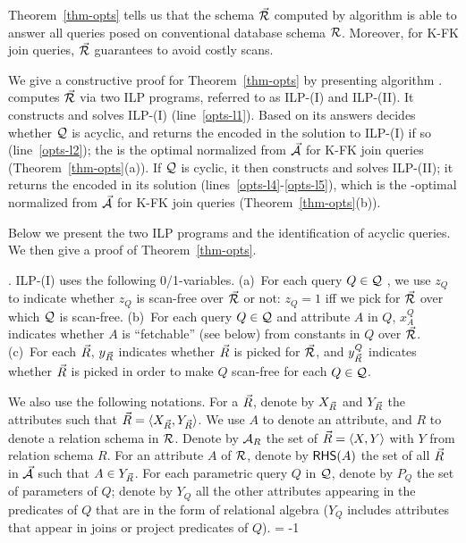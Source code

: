 \vspace{0.6ex}
Theorem~\ref{thm-opts} tells us that the \baav schema
$\vec{{\mathcal R}}$ computed by
algorithm \opts is able to answer all \SQL queries posed
on conventional database schema ${\mathcal R}$. Moreover, for 
K-FK join \SPC queries, $\vec{{\mathcal R}}$ guarantees to avoid
costly scans.

\vspace{0.6ex}
We give a constructive proof for Theorem~\ref{thm-opts}
by presenting algorithm \opts. \opts
computes $\vec{{\mathcal R}}$ via two ILP programs,
referred to as ILP-(I) and ILP-(II).
It constructs and solves ILP-(I) (line~\ref{opts-l1}).
Based on its answers \opts decides whether $\mathcal Q$ is acyclic,
and returns the \bds encoded in the solution to ILP-(I) if so
(line~\ref{opts-l2}); the \bds is the optimal normalized \bds from
$\vec{{\mathcal A}}$ for K-FK join \SPC queries
(Theorem~\ref{thm-opts}(a)). 
If $\mathcal Q$ is cyclic, it then constructs and
solves ILP-(II); it returns the \bds encoded in its solution
(lines~\ref{opts-l4}-\ref{opts-l5}), which
is the \ssf-optimal
normalized \bds from $\vec{{\mathcal A}}$ for K-FK join \SPC queries
(Theorem~\ref{thm-opts}(b)).


\vspace{0.8ex}
Below we present the two ILP programs and the identification
of acyclic queries. We then give a proof
of Theorem~\ref{thm-opts}.


. 
ILP-(I) uses the following 0/1-variables. 
(a)~For each query $Q\in \mathcal Q$ , we use $z_{Q}$ to indicate whether
$z_{Q}$ is scan-free over $\vec{{\mathcal R}}$ or not:
$z_{Q} = 1$ iff we pick \bss for $\vec{{\mathcal R}}$ over which $\mathcal Q$ is scan-free.
(b)~For each query $Q\in \mathcal Q$ and attribute $A$ in $Q$, 
$x_{A}^{Q}$ indicates whether $A$ is ``fetchable'' (see below)
from constants
in $Q$ over $\vec{{\mathcal R}}$. 
(c)~For each \bs $\vec{R}$, $y_{\vec{R}}$ indicates
whether $\vec{R}$ is picked for $\vec{{\mathcal R}}$, and $y^{Q}_{\vec{R}}$ 
indicates whether $\vec{R}$ is picked in order to make $Q$ scan-free
for each $Q\in \mathcal Q$.

\vspace{0.36ex}
We also use the following notations. For a \bs $\vec{R}$,
denote by $X_{\vec{R}}$ and $Y_{\vec{R}}$ the attributes such that
$\vec{R}\allowbreak =\allowbreak  \langle X_{\vec{R}},\allowbreak Y_{\vec{R}}\rangle$.
We use $A$ to denote an attribute, and $R$ to denote a
relation schema in ${\mathcal R}$.
Denote by ${\mathcal A}_{R}$ the set of \bss $\vec{R} \allowbreak = \allowbreak
\langle X,\allowbreak Y\rangle$ with $Y$ from relation schema $R$. For an
attribute $A$ of ${\mathcal R}$, denote by ${\mathsf{RHS}}(A)$ the set of all \bss
$\vec{R}$ in $\vec{{\mathcal A}}$ such that $A\in Y_{\vec{R}}$.
%
For each parametric query $Q$ in $\mathcal Q$, denote by $P_{Q}$ the set
of parameters of $Q$; denote by $Y_{Q}$ all the other
attributes appearing %
in the predicates of $Q$ that
are in the form of relational
algebra (\ie $Y_{Q}$ includes attributes that appear %
in joins or project predicates of $Q$). 
\looseness = -1

